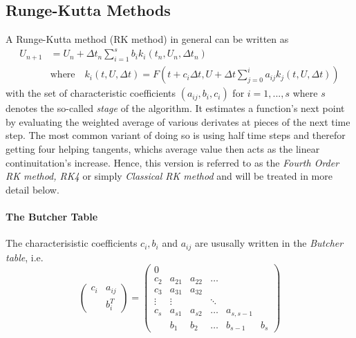 \subsection{Runge-Kutta Methods}

A Runge-Kutta method (RK method) in general can be written as
\begin{align}
U_{n+1} &= U_n + \Delta t_n \sum_{i=1}^s b_i k_i(t_n, U_n, \Delta t_n) \\
&\text{where} \quad k_i(t, U, \Delta t) = F(t+c_i\Delta t, U+ \Delta t\sum_{j=0}^{i} a_{ij} k_j(t,U,\Delta t))
\end{align}
with the set of characteristic coefficients $(a_{ij}, b_i, c_i)$ for $i = 1,...,s$ where $s$ denotes the so-called \emph{stage} of the algorithm.
It estimates a function's next point by evaluating the weighted average of various derivates at pieces of the next time step.
The most common variant of doing so is using half time steps and therefor getting four helping tangents, whichs average value then acts as the linear continuitation's increase. Hence, this version is referred to as the \emph{Fourth Order RK method, RK4} or simply \emph{Classical RK method} and will be treated in more detail below.

\paragraph{The Butcher Table}
The characterisistic coefficients $c_i, b_i$ and $a_{ij}$ are ususally written in the \emph{Butcher table}, i.e.
\begin{equation}
  \begin{pmatrix}
    c_i & a_{ij} \\
    & b_i^T
  \end{pmatrix}
  =
  \begin{pmatrix}
    0 &&&&\\
    c_2 & a_{21} & a_{22} & \dots & \\
    c_3 & a_{31} & a_{32} && \\
    \vdots & \vdots & &\ddots &\\
    c_s & a_{s1} & a_{s2} & \dots & a_{s, s-1} \\
    & b_1 & b_2 & \dots & b_{s-1} & b_s
  \end{pmatrix}
\end{equation}





